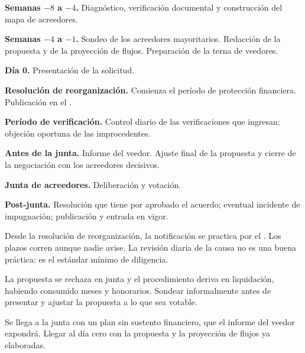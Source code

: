 \begin{checklist}
  \item \textbf{Semanas $-8$ a $-4$.} Diagnóstico, verificación documental y construcción
  del mapa de acreedores.
  \item \textbf{Semanas $-4$ a $-1$.} Sondeo de los acreedores mayoritarios. Redacción de
  la propuesta y de la proyección de flujos. Preparación de la terna de veedores.
  \item \textbf{Día 0.} Presentación de la solicitud.
  \item \textbf{Resolución de reorganización.} Comienza el período de protección
  financiera. Publicación en el \boletin{}.
  \item \textbf{Período de verificación.} Control diario de las verificaciones que
  ingresan; objeción oportuna de las improcedentes.
  \item \textbf{Antes de la junta.} Informe del veedor. Ajuste final de la propuesta y
  cierre de la negociación con los acreedores decisivos.
  \item \textbf{Junta de acreedores.} Deliberación y votación.
  \item \textbf{Post-junta.} Resolución que tiene por aprobado el acuerdo; eventual
  incidente de impugnación; publicación y entrada en vigor.
\end{checklist}

\begin{alerta}
Desde la resolución de reorganización, la notificación se practica por el \boletin{}.
Los plazos corren aunque nadie avise. La revisión diaria de la causa no es una buena
práctica: es el estándar mínimo de diligencia.
\end{alerta}

\bloqueErrores

{La propuesta se rechaza en junta y el procedimiento deriva en liquidación, habiendo
consumido meses y honorarios.}
{Sondear informalmente antes de presentar y ajustar la propuesta a lo que sea votable.}

{Se llega a la junta con un plan sin sustento financiero, que el informe del veedor
expondrá.}
{Llegar al día cero con la propuesta y la proyección de flujos ya elaboradas.}

